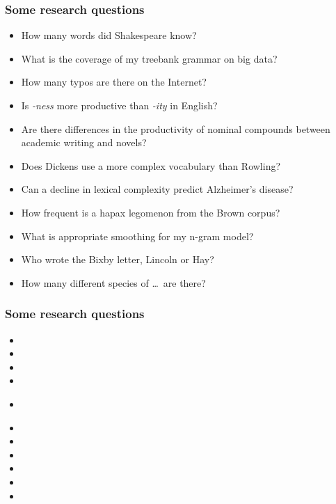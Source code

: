 \documentclass[handout,notes=show,t]{beamer} %
\begin{document}
\begin{frame}
  \frametitle{Some research questions}

  \begin{itemize}
  \item How many words did Shakespeare know?
  \item What is the coverage of my treebank grammar on big data?
  \item How many typos are there on the Internet?
  \item Is \emph{-ness} more productive than \emph{-ity} in English?
  \item Are there differences in the productivity of nominal compounds between academic writing and novels?
  \item Does Dickens use a more complex vocabulary than Rowling?
  \item Can a decline in lexical complexity predict Alzheimer's disease?
  \item How frequent is a hapax legomenon from the Brown corpus?
  \item What is appropriate smoothing for my n-gram model?
  \item Who wrote the Bixby letter, Lincoln or Hay?
  \item How many different species of \ldots\ are there? \citep{Brainerd:82}
  \end{itemize}
\end{frame}

\begin{frame}
  \frametitle{Some research questions}

  \begin{itemize}
  \item 
  \item {}
  \item
  \item
  \item {}\\\rule{0mm}{1ex}
  \item {}
  \item 
  \item {}
  \item 
  \item {}
  \item 
  \end{itemize}
\end{frame}
\end{document}
